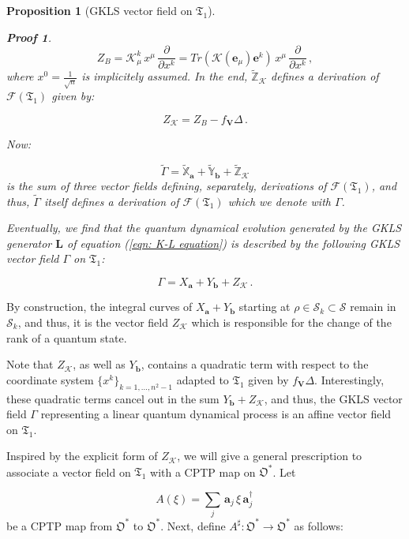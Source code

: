 \documentclass[11pt]{article}
\newcommand{\be}{\begin{equation}}
\newcommand{\ee}{\end{equation}}
\newcommand{\vsp}{\vspace{0.4cm}}
\newcommand{\stsp}{\mathcal{S}}
\newcommand{\obsp}{\mathfrak{O}}
\newtheorem{prop}{Proposition}
\newtheorem*{pf}{Proof}
\begin{document}
\begin{prop}[GKLS vector field on $\mathfrak{T}_{1}$]
\begin{pf}
\be
Z_{B}=\mathcal{K}_{\mu}^{k}\,x^{\mu}\, \frac{\partial}{\partial x^{k}}= Tr\left(\mathcal{K}(\mathbf{e}_{\mu})\mathbf{e}^{k}\right)\,x^{\mu}\, \frac{\partial}{\partial x^{k}}\,,
\ee
where $x^{0}=\frac{1}{\sqrt{n}}$ is implicitely assumed.
In the end, $\widetilde{\mathbb{Z}}_{\mathcal{K}}$ defines a derivation of $\mathcal{F}(\mathfrak{T}_{1})$ given by:

\be
Z_{\mathcal{K}}= Z_{B}   -  f_{\mathbf{V}}  \Delta \,.
\ee

Now:

$$
\widetilde{\Gamma}=  \widetilde{\mathbb{X}}_{\mathbf{a}}  + \widetilde{\mathbb{Y}}_{\mathbf{b}} +  \widetilde{\mathbb{Z}}_{\mathcal{K}}
$$
is the sum of three vector fields defining, separately, derivations of $\mathcal{F}(\mathfrak{T}_{1})$, and thus, $\widetilde{\Gamma}$ itself defines a derivation of $\mathcal{F}(\mathfrak{T}_{1})$ which we denote with $\Gamma$.


Eventually, we find that the quantum dynamical evolution generated by the GKLS generator $\mathbf{L}$ of equation (\ref{eqn: K-L equation}) is described by the following GKLS vector field $\Gamma$ on $\mathfrak{T}_{1}$:

\be
\Gamma = X_{\mathbf{a}} + Y_{\mathbf{b}} + Z_{\mathcal{K}}\,.
\ee
\end{pf}
\end{prop}


By construction, the integral curves of  $X_{\mathbf{a}}  + Y_{\mathbf{b}}$ starting at $\rho\in\stsp_{k}\subset\stsp$ remain in $\stsp_{k}$, and thus, it is the vector field $Z_{\mathcal{K}}$ which is responsible for the change of the rank of a quantum state.

Note that $Z_{\mathcal{K}}$, as well as $Y_{\mathbf{b}}$, contains a quadratic term  with respect to the coordinate system $\{x^{k}\}_{k=1,...,n^{2}-1}$ adapted to $\mathfrak{T}_{1}$ given by $f_{\mathbf{V}}\Delta$.
Interestingly, these quadratic terms cancel out in the sum $Y_{\mathbf{b}} + Z_{\mathcal{K}}$, and thus, the GKLS vector field $\Gamma$ representing a linear quantum dynamical process is an affine vector field on $\mathfrak{T}_{1}$.





\vsp

Inspired by the explicit form of $Z_{\mathcal{K}}$, we will give a general prescription to associate a vector field on $\mathfrak{T}_{1}$ with a CPTP map on $\obsp^{*}$.
Let 

$$
A(\xi)=\sum_{j}\,\mathbf{a}_{j}\,\xi\,\mathbf{a}_{j}^{\dagger}\,
$$
be a CPTP map from $\obsp^{*}$ to $\obsp^{*}$.
Next,  define $A^{\sharp}\colon \obsp^{*}\rightarrow\obsp^{*}$ as follows:
\end{document}
